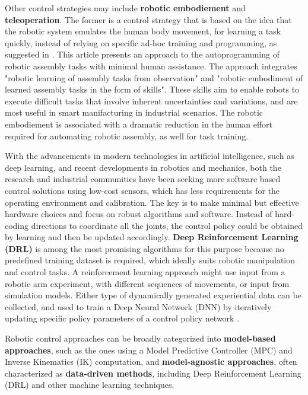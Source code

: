 Other control strategies may include \textbf{robotic embodiement} and \textbf{teleoperation}.
The former is a control strategy that is based on the idea that the
robotic system emulates the human body movement, for learning a task quickly, instead of
relying on specific ad-hoc training and programming, as suggested in \cite{ji2021manufacturing}.
This article presents an approach to the autoprogramming of robotic assembly
tasks with minimal human assistance. The approach integrates
"robotic learning of assembly tasks from observation" and
"robotic embodiment of learned assembly tasks in the form of
skills". These skills aim to enable robots to execute difficult tasks that involve inherent
uncertainties and variations, and are most useful in smart manifacturing in industrial
scenarios. The robotic embodiement is associated with a dramatic reduction in
the human effort required for automating robotic assembly, as well for task training.

With the advancements in modern technologies in artificial intelligence, such as
deep learning, and recent developments in robotics and mechanics, both the research
and industrial communities have been seeking more software based control solutions
using low-cost sensors, which has less requirements for the operating environment and
calibration. The key is to make minimal but effective hardware choices and focus on robust
algorithms and software. Instead of hard-coding directions to coordinate all the joints,
the control policy could be obtained by learning and then be updated accordingly. \textbf{Deep
	Reinforcement Learning (DRL)} is among the most promising algorithms for this purpose
because no predefined training dataset is required, which ideally suits robotic manipulation
and control tasks. A reinforcement learning approach might use
input from a robotic arm experiment, with different sequences of movements, or input
from simulation models. Either type of dynamically generated experiential data can be
collected, and used to train a Deep Neural Network (DNN) by iteratively updating specific
policy parameters of a control policy network \cite{liu2021deep}.

Robotic control approaches can be broadly categorized into \textbf{model-based approaches}, such as
the ones using a Model Predictive Controller (MPC) and Inverse Kinematics (IK) computation,
and \textbf{model-agnostic approaches}, often characterized as \textbf{data-driven methods},
including Deep Reinforcement Learning (DRL) and other machine learning techniques.

